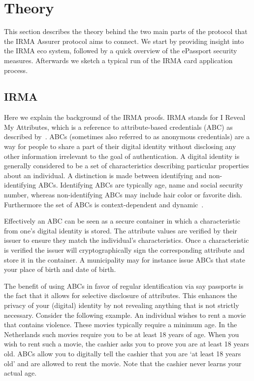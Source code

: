 \section{Theory}
This section describes the theory behind the two main parts of the protocol that the IRMA Assurer protocol aims to connect. We start by providing insight into the IRMA eco system, followed by a quick overview of the ePassport security measures. Afterwards we sketch a typical run of the IRMA card application process.

\subsection{IRMA}
Here we explain the background of the IRMA proofs. IRMA stands for I Reveal My Attributes, which is a reference to attribute-based credentials (ABC) as described by~\cite{zeroknowledgeprotocols,abcfortrust,alpar2013credential}. ABCs (sometimes also referred to as anonymous credentials) are a way for people to share a part of their digital identity without disclosing any other information irrelevant to the goal of authentication. A digital identity is generally considered to be a set of characteristics describing particular properties about an individual. A distinction is made between identifying and non-identifying ABCs. Identifying ABCs are typically age, name and social security number, whereas non-identifying ABCs may include hair color or favorite dish. Furthermore the set of ABCs is context-dependent and dynamic~\cite{abcofabc}.

Effectively an ABC can be seen as a secure container in which a characteristic from one's digital identity is stored. The attribute values are verified by their issuer to ensure they match the individual's characteristics. Once a characteristic is verified the issuer will cryptographically sign the corresponding attribute and store it in the container. A municipality may for instance issue ABCs that state your place of birth and date of birth.

The benefit of using ABCs in favor of regular identification via say passports is the fact that it allows for selective disclosure of attributes. This enhances the privacy of your (digital) identity by not revealing anything that is not strictly necessary. Consider the following example. An individual wishes to rent a movie that contains violence. These movies typically require a minimum age. In the Netherlands such movies require you to be at least 18 years of age. When you wish to rent such a movie, the cashier asks you to prove you are at least 18 years old. ABCs allow you to digitally tell the cashier that you are `at least 18 years old' and are allowed to rent the movie. Note that the cashier never learns your actual age.

